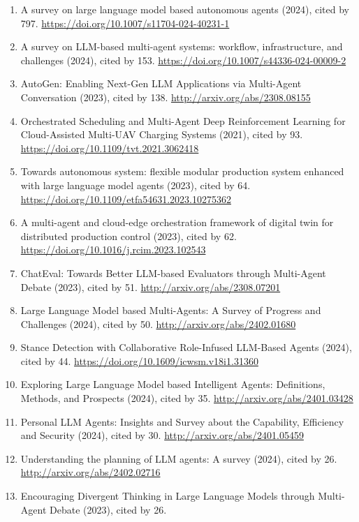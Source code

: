 \documentclass[
]{article}
\providecommand{\tightlist}{%
  \setlength{\itemsep}{0pt}\setlength{\parskip}{0pt}}
\begin{document}
\begin{enumerate}
\def\labelenumi{\arabic{enumi}.}
\tightlist
\item
  A survey on large language model based autonomous agents (2024), cited
  by 797. \url{https://doi.org/10.1007/s11704-024-40231-1}
\item
  A survey on LLM-based multi-agent systems: workflow, infrastructure,
  and challenges (2024), cited by 153.
  \url{https://doi.org/10.1007/s44336-024-00009-2}
\item
  AutoGen: Enabling Next-Gen LLM Applications via Multi-Agent
  Conversation (2023), cited by 138.
  \url{http://arxiv.org/abs/2308.08155}
\item
  Orchestrated Scheduling and Multi-Agent Deep Reinforcement Learning
  for Cloud-Assisted Multi-UAV Charging Systems (2021), cited by 93.
  \url{https://doi.org/10.1109/tvt.2021.3062418}
\item
  Towards autonomous system: flexible modular production system enhanced
  with large language model agents (2023), cited by 64.
  \url{https://doi.org/10.1109/etfa54631.2023.10275362}
\item
  A multi-agent and cloud-edge orchestration framework of digital twin
  for distributed production control (2023), cited by 62.
  \url{https://doi.org/10.1016/j.rcim.2023.102543}
\item
  ChatEval: Towards Better LLM-based Evaluators through Multi-Agent
  Debate (2023), cited by 51. \url{http://arxiv.org/abs/2308.07201}
\item
  Large Language Model based Multi-Agents: A Survey of Progress and
  Challenges (2024), cited by 50. \url{http://arxiv.org/abs/2402.01680}
\item
  Stance Detection with Collaborative Role-Infused LLM-Based Agents
  (2024), cited by 44. \url{https://doi.org/10.1609/icwsm.v18i1.31360}
\item
  Exploring Large Language Model based Intelligent Agents: Definitions,
  Methods, and Prospects (2024), cited by 35.
  \url{http://arxiv.org/abs/2401.03428}
\item
  Personal LLM Agents: Insights and Survey about the Capability,
  Efficiency and Security (2024), cited by 30.
  \url{http://arxiv.org/abs/2401.05459}
\item
  Understanding the planning of LLM agents: A survey (2024), cited by
  26. \url{http://arxiv.org/abs/2402.02716}
\item
  Encouraging Divergent Thinking in Large Language Models through
  Multi-Agent Debate (2023), cited by 26.

\end{enumerate}
\end{document}
